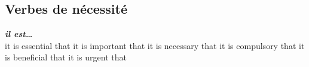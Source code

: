 \subsection*{Verbes de nécessité}
     {\bf {\em il est\ldots}}\\
   {it is essential that}
   {it is important that}
   {it is necessary that}
   {it is compulsory that}
    {it is beneficial that}
   {it is urgent that}

